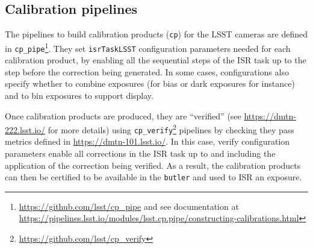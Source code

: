 \subsection{Calibration pipelines}
\label{sec:calib_pipe}

The pipelines to build calibration products (\texttt{cp}) for the LSST cameras are defined in \texttt{cp\_pipe}\footnote{\url{https://github.com/lsst/cp\_pipe} and see documentation at \url{https://pipelines.lsst.io/modules/lsst.cp.pipe/constructing-calibrations.html}}.
They set \texttt{isrTaskLSST} configuration parameters needed for each calibration product, by enabling all the sequential steps of the ISR task up to the step before the correction being generated. In some cases, configurations also specify whether to combine exposures (for bias or dark exposures for instance) and to bin exposures to support display.

Once calibration products are produced, they are ``verified'' (see \url{https://dmtn-222.lsst.io/} for more details) using \texttt{cp\_verify}\footnote{\url{https://github.com/lsst/cp\_verify}} pipelines by checking they pass metrics defined in \url{https://dmtn-101.lsst.io/}. In this case, verify configuration parameters enable all corrections in the ISR task up to and including the application of the correction being verified. As a result, the calibration products can then be certified to be available in the \texttt{butler} and used to ISR an exposure.